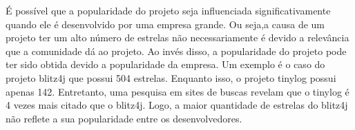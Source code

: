 É possível que a popularidade do projeto seja influenciada significativamente quando ele é desenvolvido por uma empresa grande. Ou seja,a causa de um projeto ter um alto número de estrelas não necessariamente é devido a relevância que a comunidade dá ao projeto. Ao invés disso, a popularidade do projeto pode ter sido obtida devido a popularidade da empresa. Um exemplo é o caso do projeto blitz4j que possui 504 estrelas. Enquanto isso, o projeto tinylog possui apenas 142. Entretanto, uma pesquisa em sites de buscas revelam que o tinylog é 4 vezes mais citado que o blitz4j. Logo, a maior quantidade de estrelas do blitz4j não reflete a sua popularidade entre os desenvolvedores.
